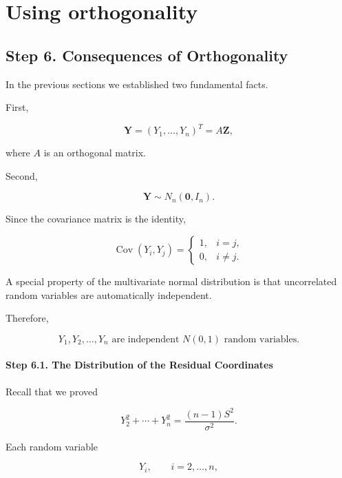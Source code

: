 \documentclass[11pt]{article}
\begin{document}
	\section{Using orthogonality}
	\begin{mdframed}[
		linewidth=0.8pt,
		roundcorner=6pt,
		backgroundcolor=gray!5,
		linecolor=gray!60,
		innertopmargin=10pt,
		innerbottommargin=10pt,
		innerleftmargin=10pt,
		innerrightmargin=10pt
		]
		
		\subsection*{Step 6. Consequences of Orthogonality}
		
		In the previous sections we established two fundamental facts.
		
		First,
		
		\[
		\mathbf Y
		=
		(Y_1,\ldots,Y_n)^T
		=
		A\mathbf Z,
		\]
		
		where $A$ is an orthogonal matrix.
		
		Second,
		
		\[
		\mathbf Y
		\sim
		N_n(\mathbf0,I_n).
		\]
		
		Since the covariance matrix is the identity,
		
		\[
		\operatorname{Cov}(Y_i,Y_j)
		=
		\begin{cases}
			1,&i=j,\\
			0,&i\neq j.
		\end{cases}
		\]
		
		A special property of the multivariate normal distribution is that
		uncorrelated random variables are automatically independent.
		
		Therefore,
		
		\[
		\boxed{
			Y_1,Y_2,\ldots,Y_n
			\text{ are independent }
			N(0,1)
			\text{ random variables.}
		}
		\]
		
		\vspace{0.3cm}
		
		\paragraph{Step 6.1. The Distribution of the Residual Coordinates}
		
		Recall that we proved
		
		\[
		Y_2^2+\cdots+Y_n^2
		=
		\frac{(n-1)S^2}{\sigma^2}.
		\]
		
		Each random variable
		
		\[
		Y_i,
		\qquad
		i=2,\ldots,n,
		\]
		

\end{mdframed}
\end{document}
